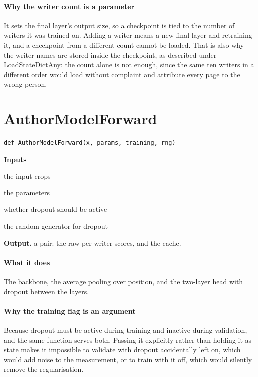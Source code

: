 \paragraph{Why the writer count is a parameter}
It sets the final layer's output size, so a checkpoint is tied to the number of writers it was trained on. Adding a writer means a new final layer and retraining it, and a checkpoint from a different count cannot be loaded. That is also why the writer names are stored inside the checkpoint, as described under LoadStateDictAny: the count alone is not enough, since the same ten writers in a different order would load without complaint and attribute every page to the wrong person.


\section{AuthorModelForward}
\begin{lstlisting}[style=sig]
def AuthorModelForward(x, params, training, rng)
\end{lstlisting}

\noindent\textbf{Inputs}
\begin{description}[leftmargin=2.2em,style=nextline,font=\normalfont\ttfamily]\setlength\itemsep{1pt}
  \item[{x}] \normalfont the input crops
  \item[{params}] \normalfont the parameters
  \item[{training}] \normalfont whether dropout should be active
  \item[{rng}] \normalfont the random generator for dropout
\end{description}

\noindent\textbf{Output.} a pair: the raw per-writer scores, and the cache.


\paragraph{What it does}
The backbone, the average pooling over position, and the two-layer head with dropout between the layers.


\paragraph{Why the training flag is an argument}
Because dropout must be active during training and inactive during validation, and the same function serves both. Passing it explicitly rather than holding it as state makes it impossible to validate with dropout accidentally left on, which would add noise to the measurement, or to train with it off, which would silently remove the regularisation.


